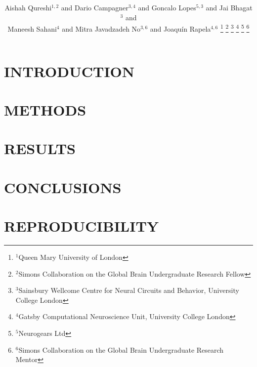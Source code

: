 \documentclass[letterpaper, 10 pt, conference]{ieeeconf}  %
\title{\LARGE \bf

}
\author{Aishah Qureshi$^{1,2}$ and Dario Campagner$^{3,4}$ and
Goncalo Lopes$^{5,3}$ and Jai Bhagat$^{3}$ and\\
Maneesh Sahani$^{4}$ and Mitra Javadzadeh No$^{3,6}$ and Joaqu\'{i}n
Rapela$^{4,6}$%
\thanks{$^{1}$Queen Mary University of London}%
\thanks{$^{2}$Simons Collaboration on the Global Brain Undergraduate Research Fellow}%
\thanks{$^{3}$Sainsbury Wellcome Centre for Neural Circuits and Behavior, University College London}%
\thanks{$^{4}$Gatsby Computational Neuroscience Unit, University College London}%
\thanks{$^{5}$Neurogears Ltd}%
\thanks{$^{6}$Simons Collaboration on the Global Brain Undergraduate Research Mentor}%
}
\begin{document}
\maketitle
\thispagestyle{empty}
\pagestyle{empty}


\begin{abstract}



\end{abstract}



\section{INTRODUCTION}



\section{METHODS}



\section{RESULTS}



\section{CONCLUSIONS}

\section{REPRODUCIBILITY}


\addtolength{\textheight}{-12cm}   %







\end{document}
